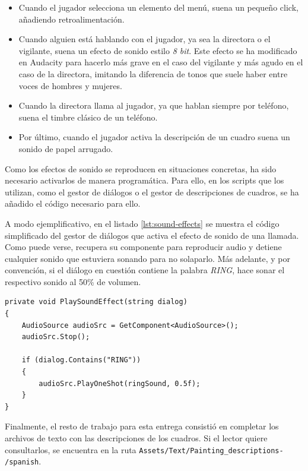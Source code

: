 \begin{itemize}
    \item Cuando el jugador selecciona un elemento del menú, suena un pequeño click, añadiendo retroalimentación.
    \item Cuando alguien está hablando con el jugador, ya sea la directora o el vigilante, suena un efecto de sonido estilo \textit{8 bit}. Este efecto se ha modificado en Audacity para hacerlo más grave en el caso del vigilante y más agudo en el caso de la directora, imitando la diferencia de tonos que suele haber entre voces de hombres y mujeres.
    \item Cuando la directora llama al jugador, ya que hablan siempre por teléfono, suena el timbre clásico de un teléfono.
    \item Por último, cuando el jugador activa la descripción de un cuadro suena un sonido de papel arrugado.
\end{itemize}

Como los efectos de sonido se reproducen en situaciones concretas, ha sido necesario activarlos de manera programática. Para ello, en los scripts que los utilizan, como el gestor de diálogos o el gestor de descripciones de cuadros, se ha añadido el código necesario para ello.

A modo ejemplificativo, en el listado \ref{lst:sound-effects} se muestra el código simplificado del gestor de diálogos que activa el efecto de sonido de una llamada. Como puede verse, recupera su componente para reproducir audio y detiene cualquier sonido que estuviera sonando para no solaparlo. Más adelante, y por convención, si el diálogo en cuestión contiene la palabra \textit{RING}, hace sonar el respectivo sonido al 50\% de volumen.

\begin{lstlisting}[caption=Fragmento del script para activar efectos de sonido, label=lst:sound-effects]
private void PlaySoundEffect(string dialog)
{       
    AudioSource audioSrc = GetComponent<AudioSource>();
    audioSrc.Stop();

    if (dialog.Contains("RING"))
    {
        audioSrc.PlayOneShot(ringSound, 0.5f);
    }
}
\end{lstlisting}

Finalmente, el resto de trabajo para esta entrega consistió en completar los archivos de texto con las descripciones de los cuadros. Si el lector quiere consultarlos, se encuentra en la ruta \texttt{Assets/Text/Painting\_descriptions-} \texttt{/spanish}.


